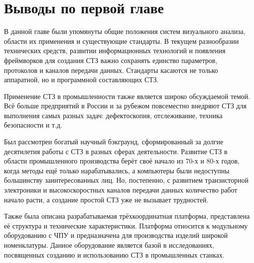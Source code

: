 \section{Выводы по первой главе} \label{sect1_6}

В данной главе были упомянуты общие положения систем визуального анализа, области их применения и существующие стандарты. В текущем разнообразии технических средств, развитии информационных технологий и появления фреймворков для создания СТЗ важно сохранять единство параметров, протоколов и каналов передачи данных. Стандарты касаются не только аппаратной, но и программной составляющих СТЗ.

Применение СТЗ в промышленности также является широко обсуждаемой темой. Всё больше предприятий в России и за рубежом повсеместно внедряют СТЗ для выполнения самых разных задач: дефектоскопия, отслеживание, техника безопасности и т.д.

Был рассмотрен богатый научный бэкграунд, сформированный за долгие десятилетия работы с СТЗ в разных сферах деятельности. Развитие СТЗ в области промышленного производства берёт своё начало из 70-х и 80-х годов, когда методы ещё только нарабатывались, а компьютеры были недоступны большинству заинтересованных лиц. Но, постепенно, с развитием транзисторной электроники и высокоскоростных каналов передачи данных количество работ начало расти, а создание простой СТЗ уже не вызывает трудностей.

Также была описана разрабатываемая трёхкоординатная платформа, представлена её структура и технические характеристики. Платформа относится к модульному оборудованию с ЧПУ и предназначена для производства изделий широкой номенклатуры. Данное оборудование является базой в исследованиях, посвященных созданию и использованию СТЗ в промышленных станках.
